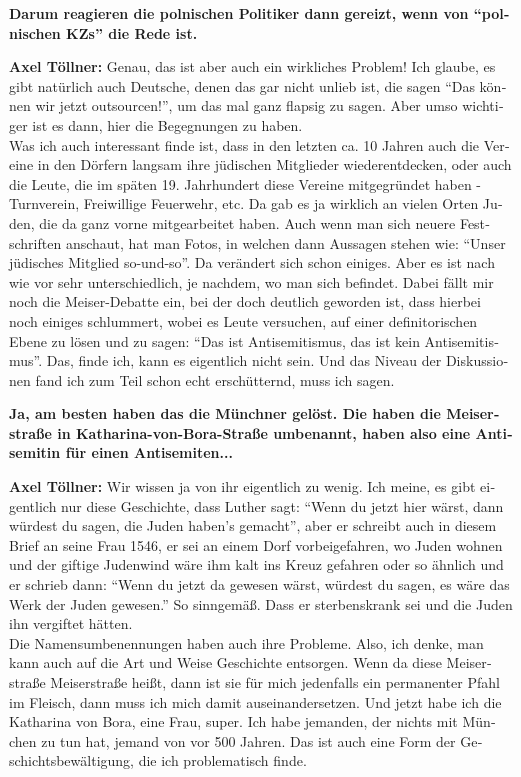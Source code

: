 \begin{otherlanguage}{ngerman}
\textbf{Darum reagieren die polnischen Politiker dann gereizt, wenn von "`polnischen KZs"' die Rede ist.} 

\textbf{Axel Töllner:} Genau, das ist aber auch ein wirkliches Problem! Ich glaube, es gibt natürlich auch Deutsche, denen das gar nicht unlieb ist, die sagen "`Das können wir jetzt outsourcen!"', um das mal ganz flapsig zu sagen. Aber umso wichtiger ist es dann, hier die Begegnungen zu haben.\\
Was ich auch interessant finde ist, dass in den letzten ca. 10 Jahren auch die Vereine in den Dörfern langsam ihre jüdischen Mitglieder wiederentdecken, oder auch die Leute, die im späten 19. Jahrhundert diese Vereine mitgegründet haben - Turnverein, Freiwillige Feuerwehr, etc. Da gab es ja wirklich an vielen Orten Juden, die da ganz vorne mitgearbeitet haben. Auch wenn man sich neuere Festschriften anschaut, hat man Fotos, in welchen dann Aussagen stehen wie: "`Unser jüdisches Mitglied so-und-so"'. Da verändert sich schon einiges. Aber es ist nach wie vor sehr unterschiedlich, je nachdem, wo man sich befindet. 
Dabei fällt mir noch die Meiser-Debatte ein, bei der doch deutlich geworden ist, dass hierbei noch einiges schlummert, wobei es Leute versuchen, auf einer definitorischen Ebene zu lösen und zu sagen: "`Das ist Antisemitismus, das ist kein Antisemitismus"'. Das, finde ich, kann es eigentlich nicht sein. Und das Niveau der Diskussionen fand ich zum Teil schon echt erschütternd, muss ich sagen. 

\textbf{Ja, am besten haben das die Münchner gelöst. Die haben die Meiserstraße in Katharina-von-Bora-Straße umbenannt, haben also eine Antisemitin für einen Antisemiten...} 

 \textbf{Axel Töllner:} Wir wissen ja von ihr eigentlich zu wenig. Ich meine, es gibt eigentlich nur diese Geschichte, dass Luther sagt: "`Wenn du jetzt hier wärst, dann würdest du sagen, die Juden haben's gemacht"', aber er schreibt auch in diesem Brief an seine Frau 1546, er sei an einem Dorf vorbeigefahren, wo Juden wohnen und der giftige Judenwind wäre ihm kalt ins Kreuz gefahren oder so ähnlich und er schrieb dann: "`Wenn du jetzt da gewesen wärst, würdest du sagen, es wäre das Werk der Juden gewesen."' So sinngemäß. Dass er sterbenskrank sei und die Juden ihn vergiftet hätten.\\
Die Namensumbenennungen haben auch ihre Probleme. Also, ich denke, man kann auch auf die Art und Weise Geschichte entsorgen. Wenn da diese Meiserstraße Meiserstraße heißt, dann ist sie für mich jedenfalls ein permanenter Pfahl im Fleisch, dann muss ich mich damit auseinandersetzen. Und jetzt habe ich die Katharina von Bora, eine Frau, super. Ich habe jemanden, der nichts mit München zu tun hat, jemand von vor 500 Jahren. Das ist auch eine Form der Geschichtsbewältigung, die ich problematisch finde. 


\end{otherlanguage}
